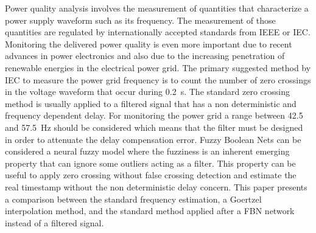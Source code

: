 
Power quality analysis involves the measurement of quantities that characterize a power supply waveform such as its frequency. The measurement of those quantities are regulated by internationally accepted standards from IEEE or IEC. Monitoring the delivered power quality is even more important due to recent advances in power electronics and also due to the increasing penetration of renewable energies in the electrical power grid. The primary suggested method by IEC to measure the power grid frequency is to count the number of zero crossings in the voltage waveform that occur during 0.2~s. The standard zero crossing method is usually applied to a filtered signal that has a non deterministic and frequency dependent delay. For monitoring the power grid a range between 42.5 and 57.5~Hz should be considered which means that the filter must be designed in order to attenuate the delay compensation error. Fuzzy Boolean Nets can be considered a neural fuzzy model where the fuzziness is an inherent emerging property that can ignore some outliers acting as a filter. This property can be useful to apply zero crossing without false crossing detection and estimate the real timestamp without the non deterministic delay concern. This paper presents a comparison between the standard frequency estimation, a Goertzel interpolation method, and the standard method applied after a FBN network instead of a filtered signal.


